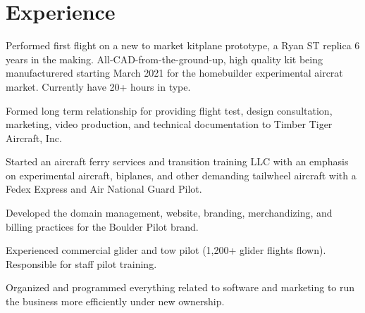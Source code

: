 \documentclass[]{mershon-two-column-resume}
\begin{document}
	\begin{minipage}[t]{0.66\textwidth} 
		
		
		\section{Experience}
		
		\vspace{\topsep} %
		\begin{tightemize}
			\item Performed first flight on a new to market kitplane prototype, a Ryan ST replica 6 years in the making. All-CAD-from-the-ground-up, high quality kit being manufacturered starting March 2021 for the homebuilder experimental aircrat market. Currently have 20+ hours in type.
			\item Formed long term relationship for providing flight test, design consultation, marketing, video production, and technical documentation to Timber Tiger Aircraft, Inc.
		\end{tightemize}
		\sectionsep
		
		\begin{tightemize}
			\item Started an aircraft ferry services and transition training LLC with an emphasis on experimental aircraft, biplanes, and other demanding tailwheel aircraft with a Fedex Express and Air National Guard Pilot.
			\item Developed the domain management, website, branding, merchandizing, and billing practices for the Boulder Pilot brand.
		\end{tightemize}
		\sectionsep
		
		\begin{tightemize}
			\item Experienced commercial glider and tow pilot (1,200+ glider flights flown). Responsible for staff pilot training.
			\item Organized and programmed everything related to software and marketing to run the business more efficiently under new ownership.
		\end{tightemize}
		\sectionsep
		

\end{minipage}
\end{document}

